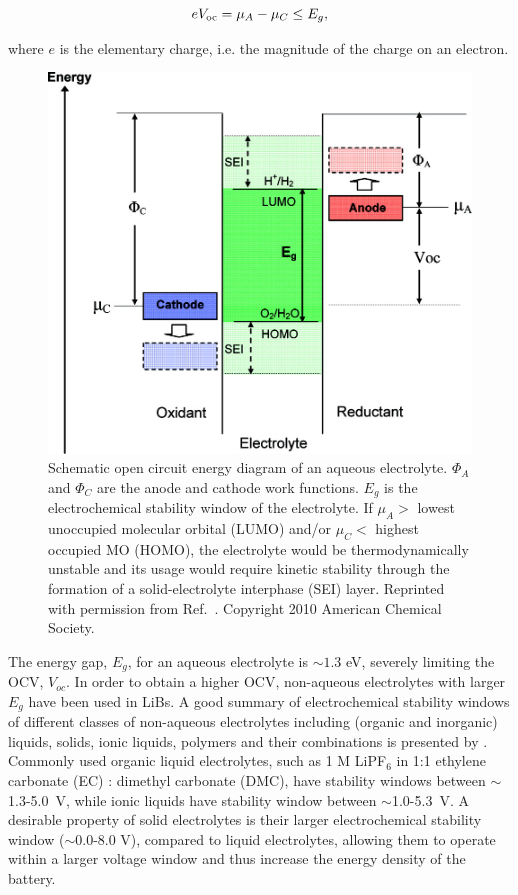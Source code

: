 \documentclass[../main.tex]{subfiles}
\begin{document}
\begin{equation}
    eV_{\rm oc}=\mu_{A}-\mu_{C}\leq E_{g},
\end{equation}

where $e$ is the elementary charge, i.e. the magnitude of the charge on an electron.

\begin{figure}
    \centering
    \includegraphics{figures/electrolyte.jpeg}
    \caption{Schematic open circuit energy diagram of an aqueous electrolyte. $\Phi_{A}$ and $\Phi_{C}$ are the anode and cathode work functions. $E_{g}$ is the electrochemical stability window of the electrolyte. If $\mu_{A}>$ lowest unoccupied molecular orbital (LUMO) and/or $\mu_{C}<$ highest occupied MO (HOMO), the electrolyte would be thermodynamically unstable and its usage would require kinetic stability through the formation of a solid-electrolyte interphase (SEI) layer. Reprinted with permission from Ref.~. Copyright 2010 American Chemical Society.}
    \label{fig:electrolyte}
\end{figure}

The energy gap, $E_g$, for an aqueous electrolyte is $\sim1.3$ eV, severely limiting the OCV, $V_{oc}$. In order to obtain a higher OCV, non-aqueous electrolytes with larger $E_g$ have been used in LiBs.\cite{Xu2004, Goodenough2010} A good summary of electrochemical stability windows of different classes of non-aqueous electrolytes including (organic and inorganic) liquids, solids, ionic liquids, polymers and their combinations is presented by \citeauthor{Goodenough2010}.\cite{Goodenough2010} Commonly used organic liquid electrolytes, such as 1 M LiPF$_6$ in 1:1 ethylene carbonate (EC) : dimethyl carbonate (DMC), have stability windows between $\sim$1.3-5.0~V, while ionic liquids have stability window between $\sim$1.0-5.3~V. A desirable property of solid electrolytes is their larger electrochemical stability window ($\sim$0.0-8.0 V), compared to liquid electrolytes,\cite{Goodenough2010} allowing them to operate within a larger voltage window and thus increase the energy density of the battery.
\end{document}
